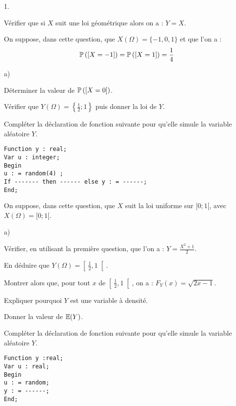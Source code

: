 \documentclass[11pt]{article}%
\begin{document}
\begin{noliste}{1.}
 \setlength{\itemsep}{4mm}

\item Vérifier que si $X$ suit une loi géométrique alors on a : $Y =
X$.

\item On suppose, dans cette question, que $X (\Omega) = \{ -1, 0, 1
\}$ et que l'on a : 
\[
 \mathbb{P}\left(\left[ { X = -1 } \right]\right) = \mathbb{P}\left(\left[ { X = 1 } \right]\right) =
\frac{1}{4} 
\]

\begin{noliste}{a)}
 \setlength{\itemsep}{2mm}

\item Déterminer la valeur de $\mathbb{P}\left(\left[ { X = 0 } \right]\right) $.

\item Vérifier que $Y ( \Omega ) = \left\{ \frac{1}{2} ; 1 \right\}$
puis donner la loi de $Y$.

\item Compléter la déclaration de fonction suivante pour qu'elle simule
la variable aléatoire $Y$.
\begin{verbatim}
Function y : real;
Var u : integer;
Begin
u : = random(4) ;
If ------- then ------ else y : = ------;
End;
\end{verbatim}

\end{noliste}

\item On suppose, dans cette question, que $X$ suit la loi uniforme sur
$[0;1[$, avec $X(\Omega) = [ 0 ; 1[$.

\begin{noliste}{a)}
 \setlength{\itemsep}{2mm}

\item Vérifier, en utilisant la première question, que l'on a : $Y =
\frac{ X^{2} + 1 }{2} $.

\item En déduire que $Y(\Omega) = \left[ \ \frac{1}{2}, 1 \right[ $.

\item Montrer alors que, pour tout $x$ de $\left[ \ \frac{1}{2}, 1
\right[$, on a : $F_{Y} (x) = \sqrt{ 2x -1 }$.

\item Expliquer pourquoi $Y$ est une variable à densité.

\item Donner la valeur de $\mathbb{E}(Y)$.

\item Compléter la déclaration de fonction suivante pour qu'elle simule
la variable aléatoire $Y$.
\begin{verbatim}
Function y :real;
Var u : real;
Begin
u : = random;
y : = ------;
End;
\end{verbatim}


\end{noliste}
\end{noliste}
\end{document}
